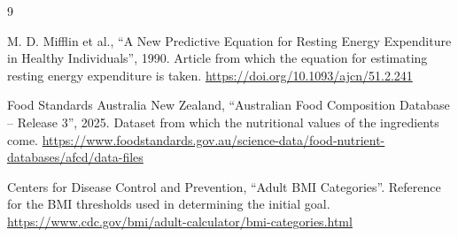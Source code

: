 \documentclass[12pt,a4paper]{article}
\begin{document}
\makeatletter
\renewcommand{\@biblabel}[1]{\textbullet}
\makeatother
\begin{thebibliography}{9}
\raggedright
\setlength{\itemsep}{0.8em}
\setlength{\parsep}{0pt}

M. D. Mifflin et al., ``A New Predictive Equation for Resting Energy
Expenditure in Healthy Individuals'', 1990. Article from which the
equation for estimating resting energy expenditure is taken.
\url{https://doi.org/10.1093/ajcn/51.2.241}

Food Standards Australia New Zealand, ``Australian Food Composition
Database -- Release 3'', 2025. Dataset from which the nutritional
values of the ingredients come.
\url{https://www.foodstandards.gov.au/science-data/food-nutrient-databases/afcd/data-files}

Centers for Disease Control and Prevention, ``Adult BMI Categories''.
Reference for the BMI thresholds used in determining
the initial goal.
\url{https://www.cdc.gov/bmi/adult-calculator/bmi-categories.html}

\end{thebibliography}
\end{document}
